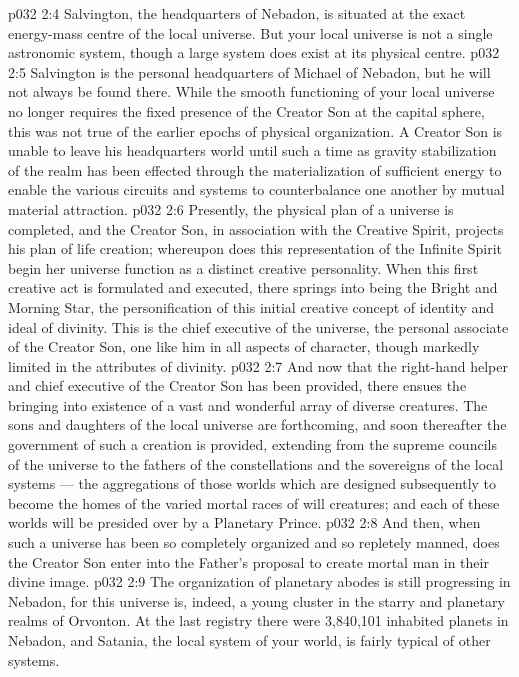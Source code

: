 \vs p032 2:4 Salvington, the headquarters of Nebadon, is situated at the exact energy\hyp{}mass centre of the local universe. But your local universe is not a single astronomic system, though a large system does exist at its physical centre.
\vs p032 2:5 Salvington is the personal headquarters of Michael of Nebadon, but he will not always be found there. While the smooth functioning of your local universe no longer requires the fixed presence of the Creator Son at the capital sphere, this was not true of the earlier epochs of physical organization. A Creator Son is unable to leave his headquarters world until such a time as gravity stabilization of the realm has been effected through the materialization of sufficient energy to enable the various circuits and systems to counterbalance one another by mutual material attraction.
\vs p032 2:6 \pc Presently, the physical plan of a universe is completed, and the Creator Son, in association with the Creative Spirit, projects his plan of life creation; whereupon does this representation of the Infinite Spirit begin her universe function as a distinct creative personality. When this first creative act is formulated and executed, there springs into being the Bright and Morning Star, the personification of this initial creative concept of identity and ideal of divinity. This is the chief executive of the universe, the personal associate of the Creator Son, one like him in all aspects of character, though markedly limited in the attributes of divinity.
\vs p032 2:7 And now that the right\hyp{}hand helper and chief executive of the Creator Son has been provided, there ensues the bringing into existence of a vast and wonderful array of diverse creatures. The sons and daughters of the local universe are forthcoming, and soon thereafter the government of such a creation is provided, extending from the supreme councils of the universe to the fathers of the constellations and the sovereigns of the local systems --- the aggregations of those worlds which are designed subsequently to become the homes of the varied mortal races of will creatures; and each of these worlds will be presided over by a Planetary Prince.
\vs p032 2:8 And then, when such a universe has been so completely organized and so repletely manned, does the Creator Son enter into the Father’s proposal to create mortal man in their divine image.
\vs p032 2:9 \pc The organization of planetary abodes is still progressing in Nebadon, for this universe is, indeed, a young cluster in the starry and planetary realms of Orvonton. At the last registry there were 3,840,101 inhabited planets in Nebadon, and Satania, the local system of your world, is fairly typical of other systems.
